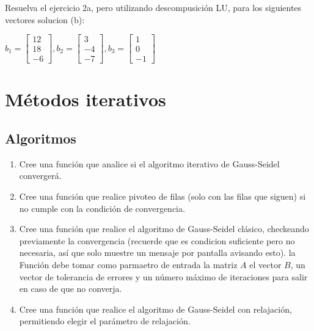 \documentclass[a4paper,11pt]{article}
\theoremstyle{mytheor}
\begin{document}
Resuelva el ejercicio 2a, pero utilizando descompusición LU, para los siguientes vectores solucion (b):

$b_1= \begin{bmatrix}
12\\
18\\
-6
\end{bmatrix},
b_2= \begin{bmatrix}
3\\
-4\\
-7
\end{bmatrix},
b_3= \begin{bmatrix}
1\\
0\\
-1
\end{bmatrix}$



\section*{Métodos iterativos}

\subsection*{Algoritmos}

\begin{enumerate}[label=\Roman*]

\item Cree una función que analice si el algoritmo iterativo de Gauss-Seidel convergerá.

\item Cree una función que realice pivoteo de filas (solo con las filas que siguen) si no cumple con la condición de convergencia.

\item Cree una función que realice el algoritmo de Gauss-Seidel clásico, checkeando previamente la convergencia (recuerde que es condicion suficiente pero no necesaria, así que solo muestre un mensaje por pantalla avisando esto). la Función debe tomar como parmaetro de entrada la matriz $A$ el vector $B$, un vector de tolerancia de errores y un número máximo de iteraciones para salir en caso de que no converja. 

\item Cree una función que realice el algoritmo de Gauss-Seidel con relajación, permitiendo elegir el parámetro de relajación.
 
\end{enumerate}
\end{document}
